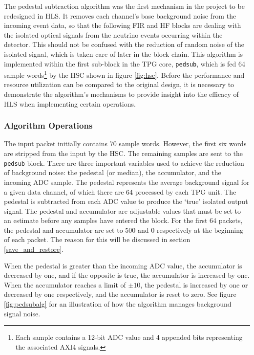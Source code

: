 \documentclass[10pt]{article}
\begin{document}
The pedestal subtraction algorithm was the first mechanism in the project to be redesigned in HLS. It removes each channel's base background noise from the incoming event data, so that the following FIR and HF blocks are dealing with the isolated optical signals from the neutrino events occurring within the detector. This should not be confused with the reduction of random noise of the isolated signal, which is taken care of later in the block chain. This algorithm is implemented within the first sub-block in the TPG core, \texttt{pedsub}, which is fed 64 sample words\footnote{Each sample contains a 12-bit ADC value and 4 appended bits representing the associated AXI4 signals.} by the HSC shown in figure \ref{fig:hsc}.  Before the performance and resource utilization can be compared to the original design, it is necessary to demonstrate the algorithm's mechanisms to provide insight into the efficacy of HLS when implementing certain operations.

\subsubsection{Algorithm Operations}

The input packet initially contains 70 sample words. However, the first six words are stripped from the input by the HSC. The remaining samples are sent to the \texttt{pedsub} block. There are three important variables used to achieve the reduction of background noise: the pedestal (or median), the accumulator, and the incoming ADC sample. The pedestal represents the average background signal for a given data channel, of which there are 64 processed by each TPG unit. The pedestal is subtracted from each ADC value to produce the `true' isolated output signal. The pedestal and accumulator are adjustable values that must be set to an estimate before any samples have entered the block. For the first 64 packets, the pedestal and accumulator are set to $500$ and $0$ respectively at the beginning of each packet. The reason for this will be discussed in section \ref{save_and_restore}.

When the pedestal is greater than the incoming ADC value, the accumulator is decreased by one, and if the opposite is true, the accumulator is increased by one. When the accumulator reaches a limit of $\pm 10$, the pedestal is increased by one or decreased by one respectively, and the accumulator is reset to zero. See figure \ref{fig:pedsubalg} for an illustration of how the algorithm manages background signal noise.
\end{document}
